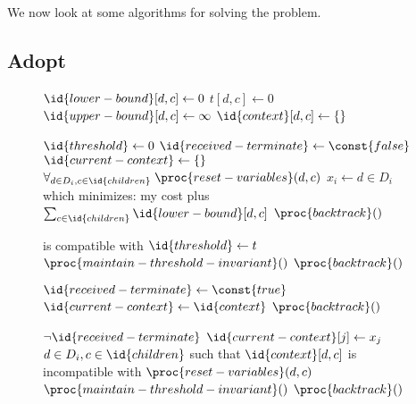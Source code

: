 We now look at some algorithms for solving the  problem.

\subsection{Adopt}

\begin{SCfigure}
  \begin{minipage}{1.0\linewidth}
    \begin{codebox}
      \li $\id{lower-bound}[d,c] \gets 0$
      \li $t[d,c] \gets 0$
      \li $\id{upper-bound}[d,c] \gets \infty$
      \li$\id{context}[d,c] \gets  \{\}$
    \end{codebox}
    \begin{codebox}
      \li $\id{threshold} \gets 0$
      \li $\id{received-terminate} \gets \const{false}$
      \li $\id{current-context} \gets \{\}$
      \li $\forall_{d \in D_i, c \in \id{children}} \; \proc{reset-variables}(d,c)$
      \li $x_i \gets d \in D_i$ which minimizes: my cost plus $\sum_{c \in
        \id{children}} \id{lower-bound}[d,c]$
      \li $\proc{backtrack}()$
    \end{codebox}
    \begin{codebox}
      \li \If {} is compatible with 
      \li   \Then $\id{threshold} \gets t$
      \li         $\proc{maintain-threshold-invariant}()$
      \li         $\proc{backtrack}()$
          \End
    \end{codebox}
    \begin{codebox}
      \li $\id{received-terminate} \gets \const{true}$
      \li $\id{current-context} \gets \id{context}$
      \li $\proc{backtrack}()$
    \end{codebox}
    \begin{codebox}
      \li \If $\neg \id{received-terminate}$
      \li \Then $\id{current-context}[j] \gets x_j$
      \li \For $d \in D_i, c \in \id{children}$ such that
      $\id{context}[d,c]$ is 
      \zi \>\>\>\>\>\>incompatible with 
      \li \Do  $\proc{reset-variables}(d,c)$
          \End
      \li  $\proc{maintain-threshold-invariant}()$
      \li  $\proc{backtrack}()$
          \End
    \end{codebox}
    \begin{codebox}

\end{codebox}
\end{minipage}
\end{SCfigure}
